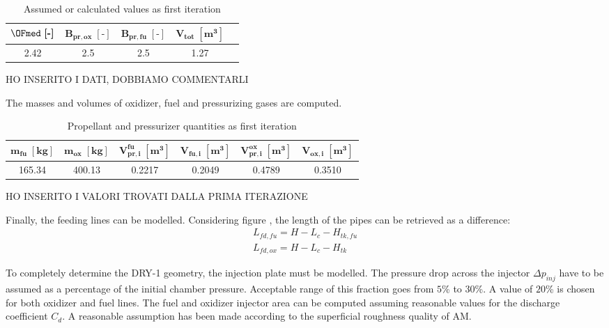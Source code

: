 \begin{table}[H]
    \renewcommand{\arraystretch}{1.4}
    \centering
    \begin{tabular}{|c|c|c|c|c|}
        \hline
        $\boldsymbol{\OFmed \; [\textbf{-}]}$ & $\boldsymbol{B_{pr,ox} \; [\textbf{-}]}$ & $\boldsymbol{B_{pr,fu} \; [\textbf{-}]}$  & $\boldsymbol{V_{tot} \; [\textbf{m}^3]}$ \\
        \hline
        \hline
        2.42 & 2.5 & 2.5 & 1.27 \\
        \hline
    \end{tabular}
    \caption{Assumed or calculated values as first iteration}
    \label{table:fata_turchina_valori_assunti}
\end{table}

HO INSERITO I DATI, DOBBIAMO COMMENTARLI

The masses and volumes of oxidizer, fuel and pressurizing gases are computed.

\begin{table}[H]
    \renewcommand{\arraystretch}{1.5}
    \centering
    \begin{tabular}{|c|c|c|c|c|c|}
        \hline
        $\boldsymbol{m_{fu} \; [\textbf{kg}]}$ & $\boldsymbol{m_{ox} \; [\textbf{kg}]}$ & $\boldsymbol{V_{pr, i}^{fu} \; [\textbf{m}^3]}$ & $\boldsymbol{V_{fu, i} \; [\textbf{m}^3]}$ & $\boldsymbol{V_{pr, i}^{ox} \; [\textbf{m}^3]}$ &  $\boldsymbol{V_{ox, i} \; [\textbf{m}^3]}$\\
        \hline
        \hline
        165.34 & 400.13 & 0.2217 & 0.2049 & 0.4789 & 0.3510 \\
        \hline
    \end{tabular}
    \caption{Propellant and pressurizer quantities as first iteration}
    \label{table:soluzioni_fata_turchina}
\end{table}

HO INSERITO I VALORI TROVATI DALLA PRIMA ITERAZIONE

Finally, the feeding lines can be modelled. Considering figure \mref, the length of the pipes can be retrieved as a difference:
\begin{gather}
    L_{fd,fu} = H - L_c - H_{tk,fu} \\
    L_{fd,ox} = H - L_c - H_{tk}
\end{gather}

To completely determine the DRY-1 geometry, the injection plate must be modelled. The pressure drop across the injector $\Delta p_{inj}$ have to be assumed as a percentage of the initial chamber pressure. Acceptable range of this fraction goes from $5$\% to $30$\%. A value of $20$\% is chosen for both oxidizer and fuel lines. The fuel and oxidizer injector area can be computed assuming reasonable values for the discharge coefficient $C_d$. A reasonable assumption has been made according to the superficial roughness quality of AM.

